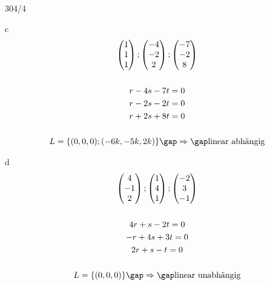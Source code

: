 \begin{exercise}{304/4}
  \item [c]
  \begin{gather*}
    \begin{pmatrix}1 \\ 1 \\ 1\end{pmatrix}; \begin{pmatrix}-4 \\ -2 \\ 2\end{pmatrix}; \begin{pmatrix}-7 \\ -2 \\ 8\end{pmatrix} \\\\
    r - 4s - 7t = 0 \\
    r - 2s - 2t = 0 \\
    r + 2s + 8t = 0 \\\\
    L = \{(0, 0, 0); (-6k, -5k, 2k)\} \gap\Rightarrow\gap \text{linear abhängig}
  \end{gather*}
  \item [d]
  \begin{gather*}
    \begin{pmatrix}4 \\ -1 \\ 2\end{pmatrix}; \begin{pmatrix}1 \\ 4 \\ 1\end{pmatrix}; \begin{pmatrix}-2 \\ 3 \\ -1\end{pmatrix} \\\\
    4r + s - 2t = 0 \\
    -r + 4s + 3t = 0 \\
    2r + s - t = 0 \\\\
    L = \{(0, 0, 0)\} \gap\Rightarrow\gap \text{linear unabhängig}
  \end{gather*}
\end{exercise}
